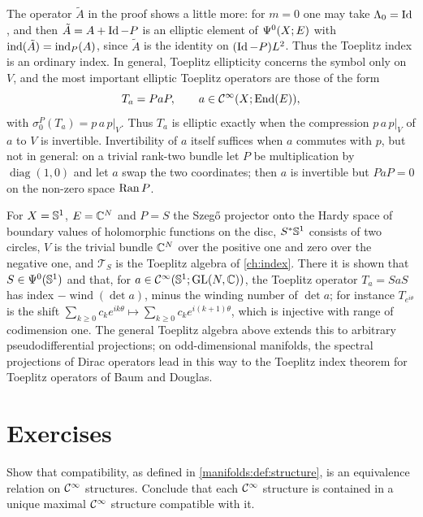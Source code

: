 The operator $\tilde A$ in the proof shows a little more: for $m=0$ one may take
$\Lambda_0=\operatorname{Id}$, and then $\tilde A=A+\operatorname{Id}-P$ is an elliptic element of $\Psi^{0}(X;E)$
with $\operatorname{ind}(\tilde A)=\operatorname{ind}_P(A)$, since $\tilde A$ is the identity on $(\operatorname{Id}-P)L^2$. Thus the
Toeplitz index is an ordinary index. In general, Toeplitz ellipticity concerns the
symbol only on $V$, and the most important elliptic Toeplitz operators are those of
the form
\begin{equation*}
T_a=PaP,\qquad a\in\mathcal{C}^\infty(X;\operatorname{End}(E)),
\end{equation*}
with $\sigma^P_0(T_a)=p\,a\,p|_V$. Thus $T_a$ is elliptic exactly when the compression
$p\,a\,p|_V$ of $a$ to $V$ is invertible. Invertibility of $a$ itself suffices when $a$
commutes with $p$, but not in general: on a trivial rank-two bundle let $P$ be
multiplication by $\operatorname{diag}(1,0)$ and let $a$ swap the two coordinates; then $a$
is invertible but $PaP=0$ on the non-zero space $\operatorname{Ran} P$.

\begin{example}\label{manifolds:example:szego}
For $X=\mathbb{S}^1$, $E=\mathbb{C}^N$ and $P=S$ the Szeg\H{o} projector onto the Hardy space of
boundary values of holomorphic functions on the disc, $S^*\mathbb{S}^1$ consists of two
circles, $V$ is the trivial bundle $\mathbb{C}^N$ over the positive one and zero over the
negative one, and $\mathcal T_S$ is the Toeplitz algebra of \cref{ch:index}. There it is
shown that $S\in\Psi^{0}(\mathbb{S}^1)$ and that, for $a\in\mathcal{C}^\infty(\mathbb{S}^1;\operatorname{GL}(N,\mathbb{C}))$, the
Toeplitz operator $T_a=SaS$ has index $-\operatorname{wind}(\det a)$, minus the winding
number of $\det a$; for instance $T_{e^{i\theta}}$ is the shift
$\sum_{k\ge0}c_ke^{ik\theta}\mapsto\sum_{k\ge0}c_ke^{i(k+1)\theta}$, which is injective with
range of codimension one. The general Toeplitz algebra above extends this to
arbitrary pseudodifferential projections; on odd-dimensional manifolds, the
spectral projections of Dirac operators lead in this way to the Toeplitz index
theorem for Toeplitz operators of Baum and Douglas.
\end{example}

\section{Exercises}\label{manifolds:sec:exercises}

\begin{exercise}\label{manifolds:ex:compatible}
Show that compatibility, as defined in \cref{manifolds:def:structure}, is an
equivalence relation on $\mathcal{C}^\infty$ structures. Conclude that each $\mathcal{C}^\infty$ structure is
contained in a unique maximal $\mathcal{C}^\infty$ structure compatible with it.
\end{exercise}

